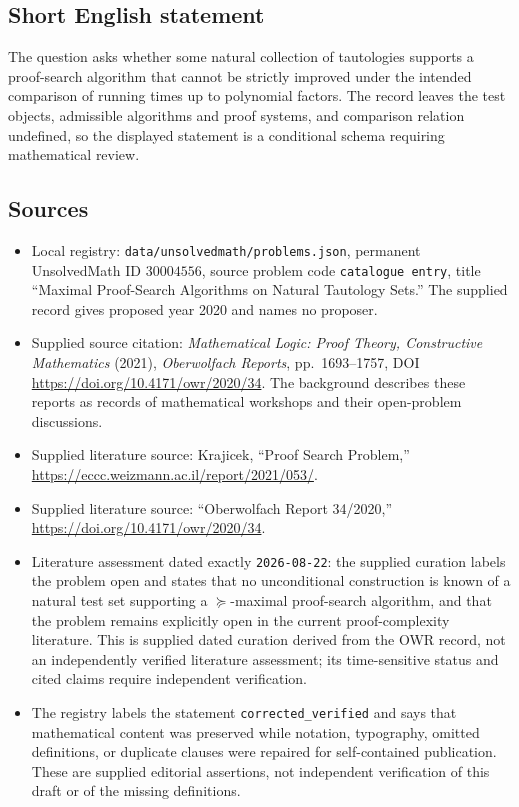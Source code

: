 \documentclass[11pt]{article}
\begin{document}
\subsection{Short English statement}
The question asks whether some natural collection of tautologies supports a proof-search algorithm that cannot be strictly improved under the intended comparison of running times up to polynomial factors. The record leaves the test objects, admissible algorithms and proof systems, and comparison relation undefined, so the displayed statement is a conditional schema requiring mathematical review.
\subsection{Sources}
\begin{itemize}
\item Local registry: \texttt{data/unsolvedmath/problems.json}, permanent UnsolvedMath ID \(30004556\), source problem code \texttt{catalogue entry}, title ``Maximal Proof-Search Algorithms on Natural Tautology Sets.'' The supplied record gives proposed year 2020 and names no proposer.
\item Supplied source citation: \emph{Mathematical Logic: Proof Theory, Constructive Mathematics} (2021), \emph{Oberwolfach Reports}, pp.~1693--1757, DOI \url{https://doi.org/10.4171/owr/2020/34}. The background describes these reports as records of mathematical workshops and their open-problem discussions.
\item Supplied literature source: Krajicek, ``Proof Search Problem,'' \url{https://eccc.weizmann.ac.il/report/2021/053/}.
\item Supplied literature source: ``Oberwolfach Report 34/2020,'' \url{https://doi.org/10.4171/owr/2020/34}.
\item Literature assessment dated exactly \texttt{2026-08-22}: the supplied curation labels the problem open and states that no unconditional construction is known of a natural test set supporting a \(\succeq\)-maximal proof-search algorithm, and that the problem remains explicitly open in the current proof-complexity literature. This is supplied dated curation derived from the OWR record, not an independently verified literature assessment; its time-sensitive status and cited claims require independent verification.
\item The registry labels the statement \texttt{corrected\_verified} and says that mathematical content was preserved while notation, typography, omitted definitions, or duplicate clauses were repaired for self-contained publication. These are supplied editorial assertions, not independent verification of this draft or of the missing definitions.
\end{itemize}
\end{document}
